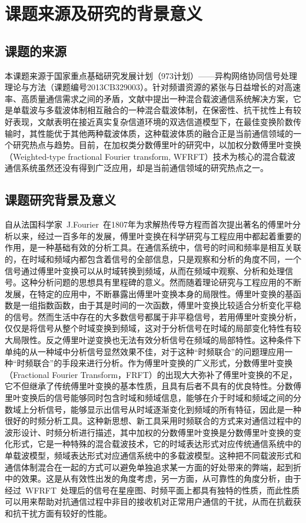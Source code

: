 
\section{课题来源及研究的背景意义}
\subsection{课题的来源}

本课题来源于国家重点基础研究发展计划（973计划）——异构网络协同信号处理理论与方法（课题编号2013CB329003）。针对频谱资源的紧张与日益增长的对高速率、高质量通信需求之间的矛盾，文献\cite{mei2010}中提出一种混合载波通信系统解决方案，它是单载波与多载波体制相互融合的一种混合载波体制，在保密性、抗干扰性上有较好表现，文献\cite{hui2015_177_179}表明在接近真实复杂信道环境的双选信道模型下，在最佳变换阶数传输时，其性能优于其他两种载波体质，这种载波体质的融合正是当前通信领域的一个研究热点与趋势。目前，在加权类分数傅里叶的研究中，以加权分数傅里叶变换（Weighted-type fractional Fourier transform,
WFRFT）技术为核心的混合载波通信系统虽然还没有得到广泛应用，却是当前通信领域的研究热点之一。


\subsection{课题研究背景及意义}

自从法国科学家~J.Fourier~在1807年为求解热传导方程而首次提出著名的傅里叶分析以来，经过一百多年的发展，傅里叶变换在科学研究与工程应用中都起着重要的作用，是一种基础有效的分析工具。在通信系统中，信号的时间和频率是相互关联的，在时域和频域内都包含着信号的全部信息，只是观察和分析的角度不同，一个信号通过傅里叶变换可以从时域转换到频域，从而在频域中观察、分析和处理信号。这种分析问题的思想具有里程碑的意义。然而随着理论研究与工程应用的不断发展，在特定的应用中，不断暴露出傅里叶变换本身的局限性。傅里叶变换的基函数是一组指数函数，由于其是时间的一次函数，傅里叶变换比较适合分析变化平稳的信号。然而生活中存在的大多数信号都属于非平稳信号，若用傅里叶变换分析，仅仅是将信号从整个时域变换到频域，这对于分析信号在时域的局部变化特性有较大局限性。反之傅里叶逆变换也无法有效分析信号在频域的局部特性。这种条件下单纯的从一种域中分析信号显然效果不佳，对于这种“时频联合”的问题理应用一种“时频联合”的手段来进行分析。作为傅里叶变换的广义形式，分数傅里叶变换（Fractional Fourier Transform，FRFT）的出现大大弥补了傅里叶变换的不足，它不但继承了传统傅里叶变换的基本性质，且具有后者不具有的优良特性。分数傅里叶变换后的信号能够同时包含时域和频域信息，能够在介于时域和频域之间的分数域上分析信号，能够显示出信号从时域逐渐变化到频域的所有特征，因此是一种很好的时频分析工具。这种新思想、新工具采用时频联合的方式来对通信过程中的波形设计、时频分析进行描述，其中加权的分数傅里叶变换是分数傅里叶变换的变化形式，它是一种特殊的混合载波技术，它的时域表达形式对应传统通信系统中的单载波模型，频域表达形式对应通信系统中的多载波模型。这种把不同载波形式和通信体制混合在一起的方式可以避免单独追求某一方面的好处带来的弊端，起到折中的效果。这是从有效性出发的角度考虑，另一方面，从可靠性的角度分析，由于经过~WFRFT~处理后的信号在星座图、时频平面上都具有独特的性质，而此性质可以用来帮助对抗通信过程中非目的接收机对正常用户通信的干扰，从而在抗截获和抗干扰方面有较好的性能。

